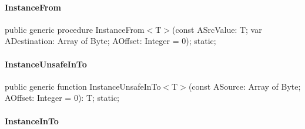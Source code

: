 \documentclass{report}
\begin{document}
\paragraph*{InstanceFrom}\hspace*{\fill}

\begin{list}{}{
\setlength{\itemindent}{0cm}
\setlength{\listparindent}{0cm}
\setlength{\leftmargin}{\evensidemargin}
\addtolength{\leftmargin}{\tmplength}
\settowidth{\labelsep}{X}
\addtolength{\leftmargin}{\labelsep}
\setlength{\labelwidth}{\tmplength}
}
\begin{flushleft}
\item[\textbf{Declaration}\hfill]
\begin{ttfamily}
public generic procedure InstanceFrom{$<$}T{$>$}(const ASrcValue: T; var ADestination: Array of Byte; AOffset: Integer = 0); static;\end{ttfamily}


\end{flushleft}
\end{list}
\paragraph*{InstanceUnsafeInTo}\hspace*{\fill}

\begin{list}{}{
\setlength{\itemindent}{0cm}
\setlength{\listparindent}{0cm}
\setlength{\leftmargin}{\evensidemargin}
\addtolength{\leftmargin}{\tmplength}
\settowidth{\labelsep}{X}
\addtolength{\leftmargin}{\labelsep}
\setlength{\labelwidth}{\tmplength}
}
\begin{flushleft}
\item[\textbf{Declaration}\hfill]
\begin{ttfamily}
public generic function InstanceUnsafeInTo{$<$}T{$>$}(const ASource: Array of Byte; AOffset: Integer = 0): T; static;\end{ttfamily}


\end{flushleft}
\end{list}
\paragraph*{InstanceInTo}\hspace*{\fill}
\end{document}
